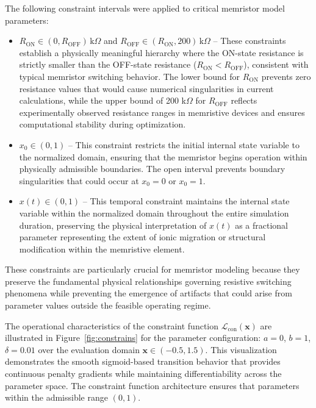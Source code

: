 \documentclass[11pt, oneside]{article}
\begin{document}
The following constraint intervals were applied to critical memristor model parameters:

\begin{itemize}
    \item $R_{\mathrm{ON}} \in (0, R_{\mathrm{OFF}})\,\mathrm{k}\Omega$ and $R_{\mathrm{OFF}} \in (R_{\mathrm{ON}}, 200)\,\mathrm{k}\Omega$ – These constraints establish a physically meaningful hierarchy where the ON-state resistance is strictly smaller than the OFF-state resistance ($R_{\mathrm{ON}} < R_{\mathrm{OFF}}$), consistent with typical memristor switching behavior. The lower bound for $R_{\mathrm{ON}}$ prevents zero resistance values that would cause numerical singularities in current calculations, while the upper bound of 200 k$\Omega$ for $R_{\mathrm{OFF}}$ reflects experimentally observed resistance ranges in memristive devices and ensures computational stability during optimization.


    \item $x_0 \in (0, 1)$ – This constraint restricts the initial internal state variable to the normalized domain, ensuring that the memristor begins operation within physically admissible boundaries. The open interval prevents boundary singularities that could occur at $x_0 = 0$ or $x_0 = 1$.

    \item $x(t) \in (0, 1)$ – This temporal constraint maintains the internal state variable within the normalized domain throughout the entire simulation duration, preserving the physical interpretation of $x(t)$ as a fractional parameter representing the extent of ionic migration or structural modification within the memristive element.
\end{itemize}

These constraints are particularly crucial for memristor modeling because they preserve the fundamental physical relationships governing resistive switching phenomena while preventing the emergence of artifacts that could arise from parameter values outside the feasible operating regime.

The operational characteristics of the constraint function $\mathcal{L}_{\mathrm{con}}(\mathbf{x})$ are illustrated in Figure~\ref{fig:constrains} for the parameter configuration: $a=0$, $b=1$, $\delta=0.01$ over the evaluation domain $\mathbf{x} \in (-0.5, 1.5)$. This visualization demonstrates the smooth sigmoid-based transition behavior that provides continuous penalty gradients while maintaining differentiability across the parameter space. The constraint function architecture ensures that parameters within the admissible range $(0,1)$.
\end{document}

